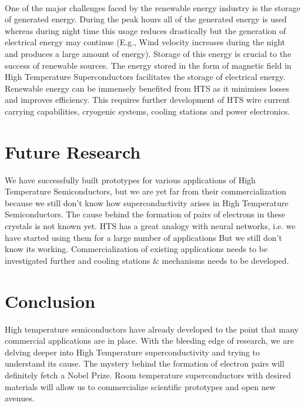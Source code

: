 \documentclass{article}
\begin{document}
	\paragraph{}
	One of the major challenges faced by the renewable energy industry is the storage of generated energy. During the peak hours all of the generated energy is used whereas during night time this usage reduces drastically but the generation of electrical energy may continue (E.g., Wind velocity increases during the night and produces a large amount of energy). Storage of this energy is crucial to the success of renewable sources. The energy stored in the form of magnetic field in High Temperature Superconductors facilitates the storage of electrical energy. Renewable energy can be immensely benefited from HTS as it minimises losses and improves efficiency. This requires further development of HTS wire current carrying capabilities, cryogenic systems, cooling stations and power electronics.
	
	\section{Future Research}
	We have successfully built prototypes for various applications of High Temperature Semiconductors, but we are yet far from their commercialization because we still don't know how superconductivity arises in High Temperature Semiconductors. The cause behind the formation of pairs of electrons in these crystals is not known yet\cite{Legget}. HTS has a great analogy with neural networks, i.e. we have started using them for a large number of applications But we still don't know its working. Commercialization of existing applications needs to be investigated further and cooling stations \& mechanisms needs to be developed.
	\section{Conclusion}
	High temperature semiconductors have already developed to the point that many commercial applications are in place. With the bleeding edge of research, we are delving deeper into High Temperature superconductivity and trying to understand its cause. The mystery behind the formation of electron pairs will definitely fetch a Nobel Prize. Room temperature superconductors with desired materials will allow us to commercialize scientific prototypes and open new avenues. 
	
	
	  
	
\end{document}
